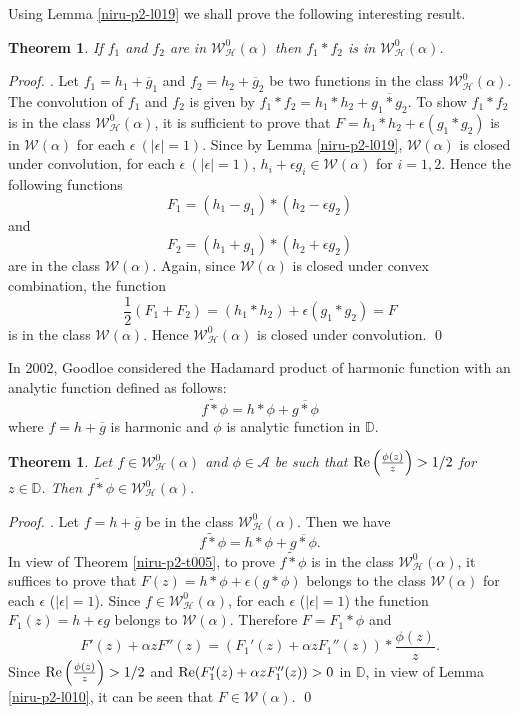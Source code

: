 \documentclass[a4paper,12pt]{amsart}
\theoremstyle{plain}
\newtheorem{thm}[equation]{Theorem}
\theoremstyle{definition}
\newenvironment{pf}[1][]{ \vskip 3mm
 \noindent
 \ifthenelse{\equal{#1}{}}  {{\slshape Proof. }}  {{\slshape #1.} } }{\qed\bigskip}
\begin{document}
\noindent Using Lemma \ref{niru-p2-l019} we shall prove the following interesting result.

\begin{thm}\label{niru-p2-t035}
If $f_1$ and $f_2$ are in $\mathcal{W}^0_{\mathcal{H}}(\alpha)$ then $f_1 * f_2$ is in $\mathcal{W}^0_{\mathcal{H}}(\alpha)$.
\end{thm}

\begin{pf}
Let $f_1 = h_1 + \overline{g}_1$ and $f_2 = h_2 + \overline{g}_2$ be two functions in the class $\mathcal{W}^0_{\mathcal{H}}(\alpha)$. The convolution of $f_1$ and $f_2$ is given by  $f_1 * f_2 = h_1*h_2 + \overline{g_1 * g_2}$. To show $f_1 * f_2 $ is in the class $\mathcal{W}^0_{\mathcal{H}}(\alpha)$, it is sufficient to prove that $F = h_1*h_2 + \epsilon ({g_1 * g_2})$ is in $\mathcal{W}(\alpha)$  for each $\epsilon~ (|\epsilon| = 1).$ Since by Lemma \ref{niru-p2-l019}, $\mathcal{W}(\alpha)$ is closed under convolution, for each $\epsilon~ (|\epsilon| = 1)$, $h_i + \epsilon g_i\in\mathcal{W}(\alpha)$ for $i = 1,2$. Hence the following functions
$$
F_1 = (h_1 - g_1) * (h_2 - \epsilon g_2)
$$ and
$$
F_2 = (h_1 + g_1) * (h_2 + \epsilon g_2)
$$
are in the class $\mathcal{W}(\alpha)$. Again, since $\mathcal{W}(\alpha)$ is closed under convex combination, the function
$$
\frac{1}{2}(F_1 + F_2 ) = (h_1*h_2) + \epsilon ({g_1 * g_2}) = F
$$
is in the class $\mathcal{W}(\alpha)$. Hence $\mathcal{W}^0_{\mathcal{H}}(\alpha)$ is closed under convolution.
\end{pf}

In 2002, Goodloe \cite{Goodloe-2002} considered the Hadamard product of harmonic function with an analytic function defined as follows:
$$
f \tilde{*} \phi = h* \phi + \overline{g * \phi}
$$
where $f = h + \overline{g}$ is harmonic and $\phi$ is analytic function in $\mathbb{D}.$

\begin{thm}\label{niru-p2-t040}
Let $f\in\mathcal{W}^0_{\mathcal{H}}(\alpha)$ and $\phi\in\mathcal{A}$ be such that ${\rm Re}\left(\frac{\phi(z)}{z}\right) > 1/2$  for $z\in\mathbb{D}$. Then $f \tilde{*} \phi\in \mathcal{W}^0_{\mathcal{H}}(\alpha).$
\end{thm}

\begin{pf}
Let $f = h + \overline{g}$ be in the class $\mathcal{W}^0_{\mathcal{H}}(\alpha)$. Then we have
$$
f \tilde{*} \phi = h*\phi + \overline{g * \phi}.
$$
In view of  Theorem \ref{niru-p2-t005}, to prove $f \tilde{*} \phi$ is in the class $\mathcal{W}^0_{\mathcal{H}}(\alpha)$, it suffices to prove that
$F(z) =  h*\phi + \epsilon ({g * \phi})$ belongs to the class $\mathcal{W}(\alpha)$ for each $\epsilon$ ($|\epsilon| = 1$).
Since $f\in\mathcal{W}^0_{\mathcal{H}}(\alpha)$, for each $\epsilon$ ($|\epsilon| = 1$) the function $F_1(z) = h + \epsilon g$ belongs to $\mathcal{W}(\alpha)$. Therefore  $F = F_1 * \phi$ and
$$
F'(z) + \alpha z F''(z) = (F_1'(z) + \alpha z F_1''(z)) * \frac{\phi(z)}{z}.
$$
Since ${\rm Re}\left(\frac{\phi(z)}{z}\right) > 1/2$ and  ${\rm Re}(F_1'(z) + \alpha z F_1''(z)) > 0$ in $\mathbb{D}$, in view of Lemma \ref{niru-p2-l010}, it can be seen that $F\in \mathcal{W}(\alpha)$.
\end{pf}
\end{document}
